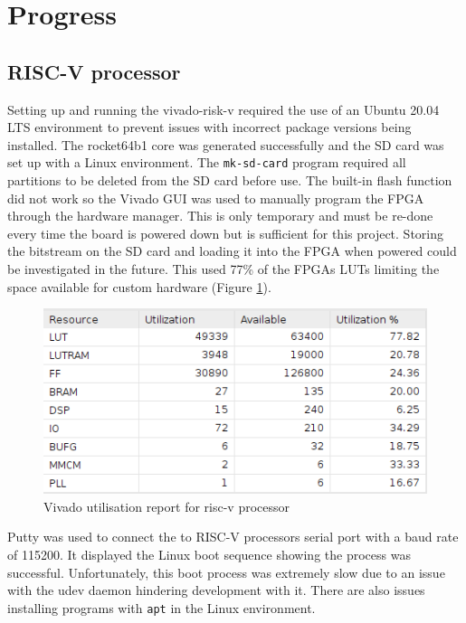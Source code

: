 \section{Progress}
\label{sec:progress}

\subsection{RISC-V processor}
Setting up and running the vivado-risk-v \cite{vivado-risk-v} required the use of an Ubuntu 20.04 LTS environment to prevent issues with incorrect package versions being installed. The rocket64b1 core was generated successfully and the SD card was set up with a Linux environment. The \texttt{mk-sd-card} program required all partitions to be deleted from the SD card before use. The built-in flash function did not work so the Vivado GUI was used to manually program the FPGA through the hardware manager. This is only temporary and must be re-done every time the board is powered down but is sufficient for this project. Storing the bitstream on the SD card and loading it into the FPGA when powered could be investigated in the future. This used 77\% of the FPGAs LUTs limiting the space available for custom hardware (Figure \ref{fig:LUT_usage}).

\begin{figure}[h]
	\centering
	\includegraphics[scale=0.6]{../common/vivado-risk-v Uilization.png}
	\caption{Vivado utilisation report for risc-v processor}
	\label{fig:LUT_usage}
\end{figure}

Putty was used to connect the to RISC-V processors serial port with a baud rate of 115200. It displayed the Linux boot sequence showing the process was successful. Unfortunately, this boot process was extremely slow due to an issue with the udev daemon hindering development with it. There are also issues installing programs with \texttt{apt} in the Linux environment.

